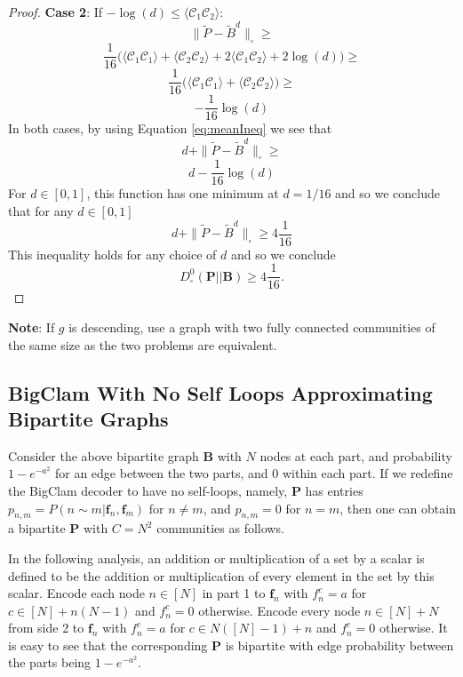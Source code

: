 \documentclass[letterpaper]{article} %
\begin{document}
\begin{proof}
\textbf{Case 2}: If $-\log(d) \leq \langle \mathcal{C}_1 \mathcal{C}_2 \rangle$:
\[\| \tilde{P}-\tilde{B}^d\|_{\square} \geq \]
\[\frac{1}{16}\bigg(\langle \mathcal{C}_1 \mathcal{C}_1 \rangle  + \langle \mathcal{C}_2 \mathcal{C}_2 \rangle + 2\langle \mathcal{C}_1 \mathcal{C}_2 \rangle +2\log(d) \bigg) \geq\]
\[\frac{1}{16}\bigg(\langle \mathcal{C}_1 \mathcal{C}_1 \rangle + \langle \mathcal{C}_2 \mathcal{C}_2 \rangle\bigg) \geq\]
\[-\frac{1}{16}\log(d)\]
In both cases, by using Equation \ref{eq:meanIneq} we see that
\[d + \| \tilde{P}-\tilde{B}^d\|_{\square} \geq \]
\[d-\frac{1}{16}\log(d)\]
For $d\in[0,1]$, this function has one minimum at $d=1/16$ and so we conclude that for any $d\in[0,1]$
\[d + \| \tilde{P}-\tilde{B}^d\|_{\square} \geq 4\frac{1}{16}\]
This inequality holds for any choice of $d$ and so we conclude
\[D^0_{\square}(\mathbf{P} || \mathbf{B}) \geq 4\frac{1}{16}.\]
\end{proof}


\textbf{Note}: If $g$ is descending, use a graph with two fully connected communities of the same size as the two problems are equivalent.
\endgroup

\subsection{BigClam With No Self Loops Approximating Bipartite Graphs}
\label{BigClam With No Self Loops Approximating Bipartites}

Consider the above bipartite graph  $\mathbf{B}$ with $N$ nodes at each part, and probability $1-e^{-a^2}$ for an edge between the two parts, and $0$ within each part. 
If we redefine the BigClam decoder to have no self-loops, namely, $\mathbf{P}$ has entries 
$p_{n,m}=P(n\sim m|\mathbf{f}_n, \mathbf{f}_m)$ for $n\neq m$, and $p_{n,m}=0$ for $n=m$, then one can obtain a bipartite $\mathbf{P}$ with $C=N^2$ communities as follows. 

In the following analysis, an addition or multiplication of a set by a scalar is defined to be the addition or multiplication of every element in the set by this scalar.
Encode each node $n\in[N]$ in part 1 to $\mathbf{f}_n$ with
$f_n^c=a$ for $c\in [N]+n(N-1)$ and $f_n^c=0$ otherwise. Encode every node $n\in [N]+N$ from side 2 to $\mathbf{f}_n$ with
$f_n^c=a$ for $c\in N([N]-1)+n$ and $f_n^c=0$ otherwise. It is easy to see that the corresponding $\mathbf{P}$ is bipartite with edge probability between the parts being $1-e^{-a^2}$.
\end{document}
